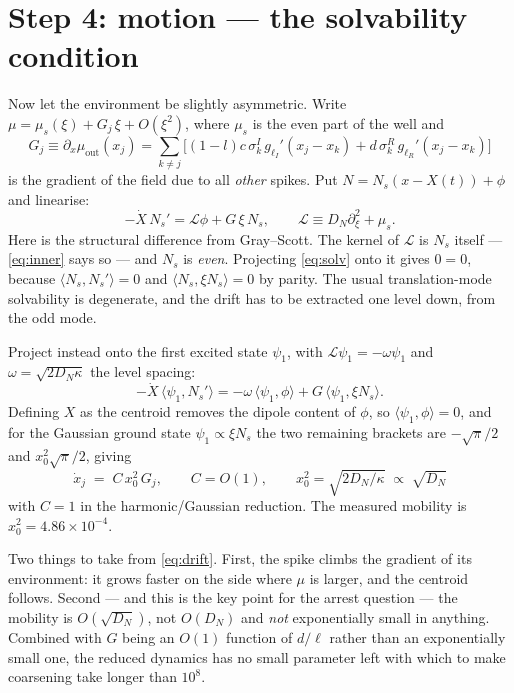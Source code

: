 \documentclass[11pt,a4paper]{article}
\newcommand{\Ns}{N_{s}}
\newcommand{\lI}{\ell_I}
\newcommand{\lR}{\ell_R}
\newcommand{\xj}{x_j}
\newcommand{\muout}{\mu_{\mathrm{out}}}
\theoremstyle{plain}
\theoremstyle{remark}
\begin{document}
\section{Step 4: motion --- the solvability condition}

Now let the environment be slightly asymmetric. Write $\mu = \mu_s(\xi) +
G_j\,\xi + O(\xi^2)$, where $\mu_s$ is the even part of the well and
\begin{equation}
  G_j \equiv \partial_x \muout(\xj)
   = \sum_{k\neq j}\Big[(1-l)c\,\sigma^I_k\,g_{\lI}'(\xj - x_k)
     + d\,\sigma^R_k\,g_{\lR}'(\xj - x_k)\Big]
\label{eq:G}
\end{equation}
is the gradient of the field due to all \emph{other} spikes. Put
$N = \Ns(x - X(t)) + \phi$ and linearise:
\begin{equation}
  -\dot X\, \Ns' = \mathcal{L}\phi + G\,\xi\,\Ns ,
  \qquad \mathcal{L} \equiv D_N\partial_\xi^2 + \mu_s .
\label{eq:solv}
\end{equation}
Here is the structural difference from Gray--Scott. The kernel of $\mathcal{L}$
is $\Ns$ itself --- \eqref{eq:inner} says so --- and $\Ns$ is \emph{even}.
Projecting \eqref{eq:solv} onto it gives $0 = 0$, because
$\langle \Ns,\Ns'\rangle = 0$ and $\langle \Ns, \xi \Ns\rangle = 0$ by parity.
The usual translation-mode solvability is degenerate, and the drift has to be
extracted one level down, from the odd mode.

Project instead onto the first excited state $\psi_1$, with
$\mathcal{L}\psi_1 = -\omega\psi_1$ and $\omega = \sqrt{2D_N\kappa}$ the
level spacing:
\begin{equation}
  -\dot X\,\langle \psi_1, \Ns'\rangle
  = -\omega\,\langle\psi_1,\phi\rangle + G\,\langle \psi_1, \xi \Ns\rangle .
\end{equation}
Defining $X$ as the centroid removes the dipole content of $\phi$, so
$\langle\psi_1,\phi\rangle = 0$, and for the Gaussian ground state
$\psi_1 \propto \xi\Ns$ the two remaining brackets are $-\sqrt{\pi}/2$ and
$x_0^2\sqrt{\pi}/2$, giving
\begin{equation}
  \boxed{\;\dot \xj \;=\; C\,x_0^2\, G_j, \qquad C = O(1),
  \qquad x_0^2 = \sqrt{2D_N/\kappa} \;\propto\; \sqrt{D_N}\;}
\label{eq:drift}
\end{equation}
with $C = 1$ in the harmonic/Gaussian reduction. The measured mobility is
$x_0^2 = 4.86\times10^{-4}$.

Two things to take from \eqref{eq:drift}. First, the spike climbs the gradient
of its environment: it grows faster on the side where $\mu$ is larger, and the
centroid follows. Second --- and this is the key point for the arrest
question --- the mobility is $O(\sqrt{D_N})$, not $O(D_N)$ and \emph{not}
exponentially small in anything. Combined with $G$ being an $O(1)$ function of
$d/\ell$ rather than an exponentially small one, the reduced dynamics has no
small parameter left with which to make coarsening take longer than $10^8$.
\end{document}
